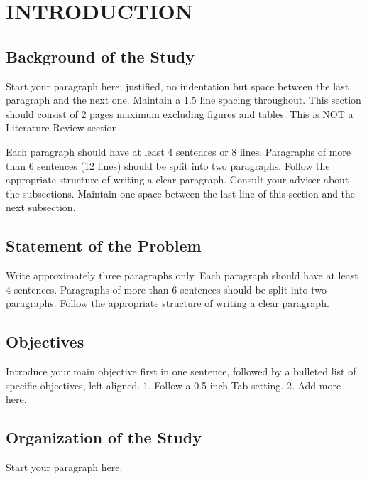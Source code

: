 \chapter{INTRODUCTION} 

\section{Background of the Study}

Start your paragraph here; justified, no indentation but space between the last paragraph and the next one.  Maintain a 1.5 line spacing throughout.  This section should consist of 2 pages maximum excluding figures and tables.  This is NOT a Literature Review section. 

Each paragraph should have at least 4 sentences or 8 lines.  Paragraphs of more than 6 sentences (12 lines) should be split into two paragraphs.  Follow the appropriate structure of writing a clear paragraph. Consult your adviser about the subsections. Maintain one space between the last line of this section and the next subsection.

\section{Statement of the Problem}

Write approximately three paragraphs only.  Each paragraph should have at least 4 sentences. Paragraphs of more than 6 sentences should be split into two paragraphs. Follow the appropriate structure of writing a clear paragraph.

\section{Objectives}

Introduce your main objective first in one sentence, followed by a bulleted list of specific objectives, left aligned.
1.	Follow a 0.5-inch Tab setting.
2.	Add more here.

\section{Organization of the Study}
Start your paragraph here.